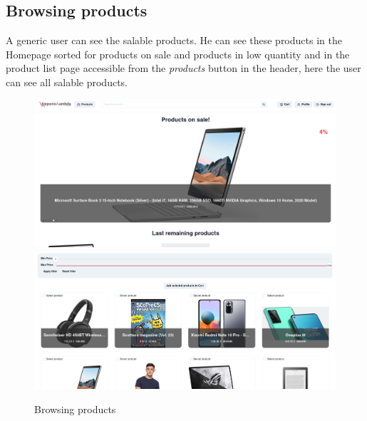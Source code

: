 \subsection{Browsing products}
A generic user can see the salable products. He can see these products in the Homepage sorted for products on sale and products in low quantity and in the product list page accessible from the \textit{products} button in the header, here the user can see all salable products.
\begin{figure}[!ht]
    \caption{Browsing products}
    \vspace{10px}
    \includegraphics[scale=0.1]{../../../../Images/userManual/home.png}
    \hspace{20px}
    \includegraphics[scale=0.1]{../../../../Images/userManual/PLP.png}
    \centering
\end{figure}

